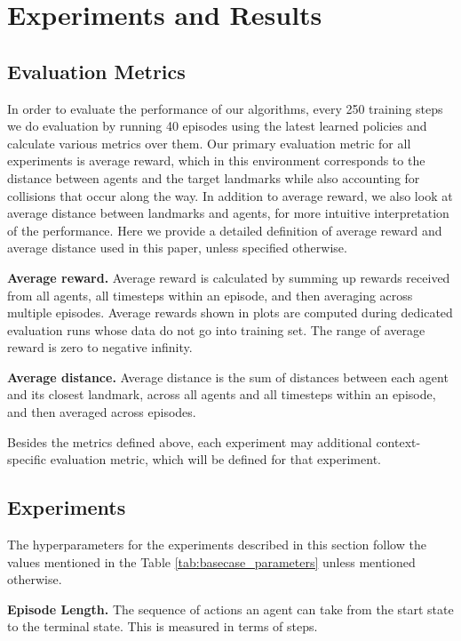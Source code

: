 \documentclass{article}
\begin{document}
\section{Experiments and Results}
\subsection{Evaluation Metrics}

In order to evaluate the performance of our algorithms, every 250 training steps we do evaluation by running 40 episodes using the latest learned policies and calculate various metrics over them. Our primary evaluation metric for all experiments is average reward, which in this environment corresponds to the distance between agents and the target landmarks while also accounting for collisions that occur along the way. In addition to average reward, we also look at average distance between landmarks and agents, for more intuitive interpretation of the performance. Here we provide a detailed definition of average reward and average distance used in this paper, unless specified otherwise.

\textbf{Average reward.} Average reward is calculated by summing up rewards received from all agents, all timesteps within an episode, and then averaging across multiple episodes. Average rewards shown in plots are computed during dedicated evaluation runs whose data do not go into training set. The range of average reward is zero to negative infinity. 

\textbf{Average distance.} Average distance is the sum of distances between each agent and its closest landmark, across all agents and all timesteps within an episode, and then averaged across episodes.

Besides the metrics defined above, each experiment may additional context-specific evaluation metric, which will be defined for that experiment.


\subsection{Experiments}

The hyperparameters for the experiments described in this section follow the values mentioned in the Table \ref{tab:basecase_parameters} unless mentioned otherwise.

\textbf{Episode Length.} The sequence of actions an agent can take from the start state to the terminal state. This is measured in terms of steps.
\end{document}
